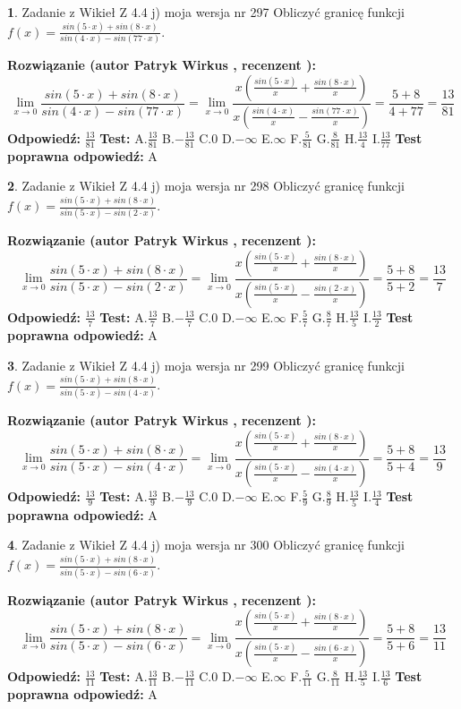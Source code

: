 \documentclass[12pt, a4paper]{article}
\theoremstyle{definition} %
\newtheorem{zad}{}
\newcommand{\zadStart}[1]{\begin{zad}#1\newline}
\newcommand{\zadStop}{\end{zad}}
\newcommand{\rozwStart}[2]{\noindent \textbf{Rozwiązanie (autor #1 , recenzent #2): }\newline}
\newcommand{\rozwStop}{\newline}
\newcommand{\odpStart}{\noindent \textbf{Odpowiedź:}\newline}
\newcommand{\odpStop}{\newline}
\newcommand{\testStart}{\noindent \textbf{Test:}\newline}
\newcommand{\testStop}{\newline}
\newcommand{\kluczStart}{\noindent \textbf{Test poprawna odpowiedź:}\newline}
\newcommand{\kluczStop}{\newline}
\begin{document}
\zadStart{Zadanie z Wikieł Z 4.4 j) moja wersja nr 297}
Obliczyć granicę funkcji $f(x)=\frac{sin(5\cdot x) +sin(8\cdot x)}{sin(4\cdot x) -sin(77\cdot x)}$.
\zadStop
\rozwStart{Patryk Wirkus}{}
$$\lim\limits_{x\to 0}\frac{sin(5\cdot x) +sin(8\cdot x)}{sin(4\cdot x) -sin(77\cdot x)}=\lim\limits_{x\to 0}\frac{x(\frac{sin(5\cdot x)}{x}+\frac{sin(8\cdot x)}{x})}{x(\frac{sin(4\cdot x)}{x}-\frac{sin(77\cdot x)}{x})}=\frac{5+8}{4+77} = \frac{13}{81}$$
\rozwStop
\odpStart
$\frac{13}{81}$
\odpStop
\testStart
A.$\frac{13}{81}$
B.$-\frac{13}{81}$
C.$0$
D.$-\infty$
E.$\infty$
F.$\frac{5}{81}$
G.$\frac{8}{81}$
H.$\frac{13}{4}$
I.$\frac{13}{77}$
\testStop
\kluczStart
A
\kluczStop



\zadStart{Zadanie z Wikieł Z 4.4 j) moja wersja nr 298}
Obliczyć granicę funkcji $f(x)=\frac{sin(5\cdot x) +sin(8\cdot x)}{sin(5\cdot x) -sin(2\cdot x)}$.
\zadStop
\rozwStart{Patryk Wirkus}{}
$$\lim\limits_{x\to 0}\frac{sin(5\cdot x) +sin(8\cdot x)}{sin(5\cdot x) -sin(2\cdot x)}=\lim\limits_{x\to 0}\frac{x(\frac{sin(5\cdot x)}{x}+\frac{sin(8\cdot x)}{x})}{x(\frac{sin(5\cdot x)}{x}-\frac{sin(2\cdot x)}{x})}=\frac{5+8}{5+2} = \frac{13}{7}$$
\rozwStop
\odpStart
$\frac{13}{7}$
\odpStop
\testStart
A.$\frac{13}{7}$
B.$-\frac{13}{7}$
C.$0$
D.$-\infty$
E.$\infty$
F.$\frac{5}{7}$
G.$\frac{8}{7}$
H.$\frac{13}{5}$
I.$\frac{13}{2}$
\testStop
\kluczStart
A
\kluczStop



\zadStart{Zadanie z Wikieł Z 4.4 j) moja wersja nr 299}
Obliczyć granicę funkcji $f(x)=\frac{sin(5\cdot x) +sin(8\cdot x)}{sin(5\cdot x) -sin(4\cdot x)}$.
\zadStop
\rozwStart{Patryk Wirkus}{}
$$\lim\limits_{x\to 0}\frac{sin(5\cdot x) +sin(8\cdot x)}{sin(5\cdot x) -sin(4\cdot x)}=\lim\limits_{x\to 0}\frac{x(\frac{sin(5\cdot x)}{x}+\frac{sin(8\cdot x)}{x})}{x(\frac{sin(5\cdot x)}{x}-\frac{sin(4\cdot x)}{x})}=\frac{5+8}{5+4} = \frac{13}{9}$$
\rozwStop
\odpStart
$\frac{13}{9}$
\odpStop
\testStart
A.$\frac{13}{9}$
B.$-\frac{13}{9}$
C.$0$
D.$-\infty$
E.$\infty$
F.$\frac{5}{9}$
G.$\frac{8}{9}$
H.$\frac{13}{5}$
I.$\frac{13}{4}$
\testStop
\kluczStart
A
\kluczStop



\zadStart{Zadanie z Wikieł Z 4.4 j) moja wersja nr 300}
Obliczyć granicę funkcji $f(x)=\frac{sin(5\cdot x) +sin(8\cdot x)}{sin(5\cdot x) -sin(6\cdot x)}$.
\zadStop
\rozwStart{Patryk Wirkus}{}
$$\lim\limits_{x\to 0}\frac{sin(5\cdot x) +sin(8\cdot x)}{sin(5\cdot x) -sin(6\cdot x)}=\lim\limits_{x\to 0}\frac{x(\frac{sin(5\cdot x)}{x}+\frac{sin(8\cdot x)}{x})}{x(\frac{sin(5\cdot x)}{x}-\frac{sin(6\cdot x)}{x})}=\frac{5+8}{5+6} = \frac{13}{11}$$
\rozwStop
\odpStart
$\frac{13}{11}$
\odpStop
\testStart
A.$\frac{13}{11}$
B.$-\frac{13}{11}$
C.$0$
D.$-\infty$
E.$\infty$
F.$\frac{5}{11}$
G.$\frac{8}{11}$
H.$\frac{13}{5}$
I.$\frac{13}{6}$
\testStop
\kluczStart
A
\kluczStop
\end{document}
